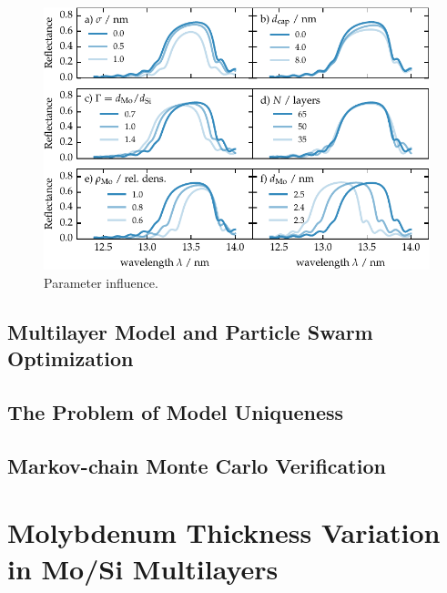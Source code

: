 \begin{figure}[htbp]
\centering
\includegraphics{img/parameter_influence}
\caption{Parameter influence.}
\label{ch_spec:fig_mo_si_parameter_influence}
\end{figure}

\subsection{Multilayer Model and Particle Swarm Optimization}

\subsection{The Problem of Model Uniqueness}

\subsection{Markov-chain Monte Carlo Verification}


\section{Molybdenum Thickness Variation in Mo/Si Multilayers}


